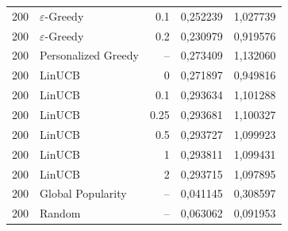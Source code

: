 \begin{longtable}{rlrrr}
200 & $\varepsilon$-Greedy & 0.1 & 0,252239 & 1,027739 \\
200 & $\varepsilon$-Greedy & 0.2 & 0,230979 & 0,919576 \\
200 & Personalized Greedy & -- & 0,273409 & 1,132060 \\
200 & LinUCB & 0 & 0,271897 & 0,949816 \\
200 & LinUCB & 0.1 & 0,293634 & 1,101288 \\
200 & LinUCB & 0.25 & 0,293681 & 1,100327 \\
200 & LinUCB & 0.5 & 0,293727 & 1,099923 \\
200 & LinUCB & 1 & 0,293811 & 1,099431 \\
200 & LinUCB & 2 & 0,293715 & 1,097895 \\
200 & Global Popularity & -- & 0,041145 & 0,308597 \\
200 & Random & -- & 0,063062 & 0,091953 \\
\bottomrule\end{longtable}